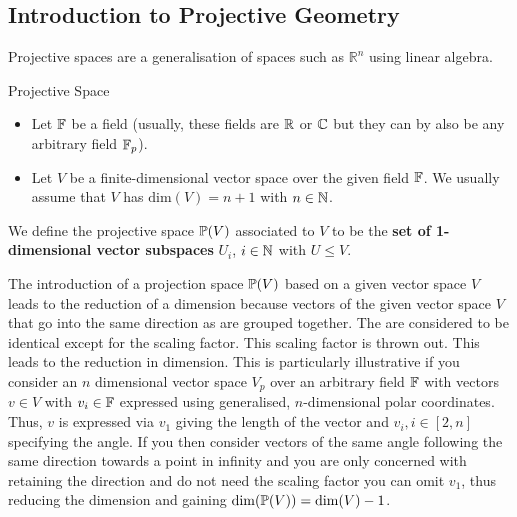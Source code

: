 \subsection{Introduction to Projective Geometry}

Projective spaces are a generalisation of spaces such as $\mathbb{R}^n$ using linear algebra. \\

\begin{definitionBox}{Projective Space}
    
    \begin{itemize}
        \item Let $\mathbb{F}$ be a field (usually, these fields are $\mathbb{R}$ or $\mathbb{C}$ but they can by also be any arbitrary field $\mathbb{F}_p$).
        \item Let $V$ be a finite-dimensional vector space over the given field $\mathbb{F}$. We usually assume that $V$ has $\mathrm{dim}(V) = n +1$ with $n \in \mathbb{N}$.
    \end{itemize}  

    We define the projective space $\mathbb{P}(V)$ associated to $V$ to be the \textbf{set of 1-dimensional vector subspaces} $U_i$, $i \in \mathbb{N}$ with $U \leq V$.
\end{definitionBox}

\vspace{0.5cm}

The introduction of a projection space $\mathbb{P}(V)$ based on a given vector space $V$ leads to the reduction of a dimension because vectors of the given vector space $V$ that go into the same direction as are grouped together. The are considered to be identical except for the scaling factor. This scaling factor is thrown out. This leads to the reduction in dimension. This is particularly illustrative if you consider an $n$ dimensional vector space $V_p$ over an arbitrary field $\mathbb{F}$ with vectors $v\in V$ with $v_i \in \mathbb{F}$ expressed using generalised, $n$-dimensional polar coordinates. Thus, $v$ is expressed via $v_1$ giving the length of the vector and $v_i, i \in [2,n]$ specifying the angle. If you then consider vectors of the same angle following the same direction towards a point in infinity and you are only concerned with retaining the direction and do not need the scaling factor you can omit $v_1$, thus reducing the dimension and gaining $\mathrm{dim}(\mathbb{P}(V)) = \mathrm{dim}(V) - 1$. 


